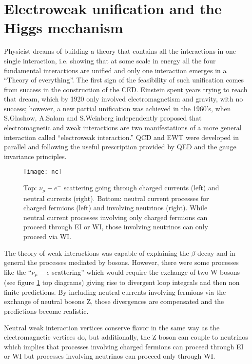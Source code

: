 \section{Electroweak unification and the Higgs mechanism}\label{sec:EWI}

\noindent Physicist dreams of building a theory that contains all the interactions in one single interaction, i.e. showing that at some scale in energy all the four fundamental interactions are unified and only one interaction emerges in a ``Theory of everything''. The first sign of the feasibility of such unification comes from success in the construction of the CED. Einstein spent years trying to reach that dream, which by 1920 only involved electromagnetism and gravity, with no success; however, a new partial unification was achieved in the 1960's, when S.Glashow\cite{glashow}, A.Salam\cite{salam} and S.Weinberg \cite{weinberg} independently proposed that electromagnetic and weak interactions are two manifestations of a more general interaction called ``electroweak interaction.'' QCD and EWT were developed in parallel and following the useful prescription provided by QED and the gauge invariance principles.

\begin{figure}[h!]
  \centering
  \texttt{[image: nc]}
  \caption[Neutral current processes]{Top: $\nu_{\mu}-e^-$ scattering going through charged currents (left) and neutral currents (right). Bottom: neutral current processes for charged fermions (left) and involving neutrinos (right). While neutral current processes involving only charged fermions can proceed through EI or WI, those involving neutrinos can only proceed via WI.}%
         \label{nc}
\end{figure}
         
\noindent The theory of weak interactions was capable of explaining the $\beta$-decay and in general the processes mediated by \wpm bosons. However, there were some processes like the ``$\nu_\mu - e$ scattering'' which would require the exchange of two W bosons (see figure \ref{nc} top diagrams) giving rise to divergent loop integrals and then non finite predictions. By including neutral currents involving fermions via the exchange of neutral bosons Z, those divergences are compensated and the predictions become realistic.

\noindent Neutral weak interaction vertices conserve flavor in the same way as the electromagnetic vertices do, but additionally, the Z boson can couple to neutrinos which implies that processes involving charged fermions can proceed through EI or WI but processes involving neutrinos can proceed only through WI.   

